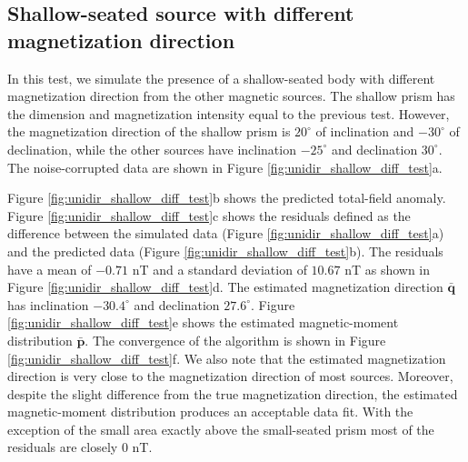 \subsection{Shallow-seated source with different magnetization direction}

In this test, we simulate the presence of a shallow-seated body with different magnetization direction from the other magnetic sources. The shallow prism has the dimension and magnetization intensity equal to the previous test. However, the magnetization direction of the shallow prism is $20^\circ$ of inclination and $-30^\circ$ of declination, while the other sources have inclination $-25^\circ$ and declination $30^\circ$. The noise-corrupted data are shown in Figure \ref{fig:unidir_shallow_diff_test}a.

Figure \ref{fig:unidir_shallow_diff_test}b shows the predicted total-field anomaly. Figure \ref{fig:unidir_shallow_diff_test}c shows the residuals defined as the difference between the simulated data (Figure \ref{fig:unidir_shallow_diff_test}a) and the predicted data (Figure \ref{fig:unidir_shallow_diff_test}b). The residuals have a mean of $-0.71$ nT and a standard deviation of $10.67$ nT as shown in Figure \ref{fig:unidir_shallow_diff_test}d. The estimated magnetization direction $\bar{\mathbf{q}}$ has inclination $-30.4^\circ$ and declination $27.6^\circ$. Figure \ref{fig:unidir_shallow_diff_test}e shows the estimated magnetic-moment distribution $\bar{\mathbf{p}}$. The convergence of the algorithm is shown in Figure \ref{fig:unidir_shallow_diff_test}f. We also note that the estimated magnetization direction is very close to the magnetization direction of most sources. Moreover, despite the slight difference from the true magnetization direction, the estimated magnetic-moment distribution produces an acceptable data fit. With the exception of the small area exactly above the small-seated prism most of the residuals are closely $0$ nT.  

